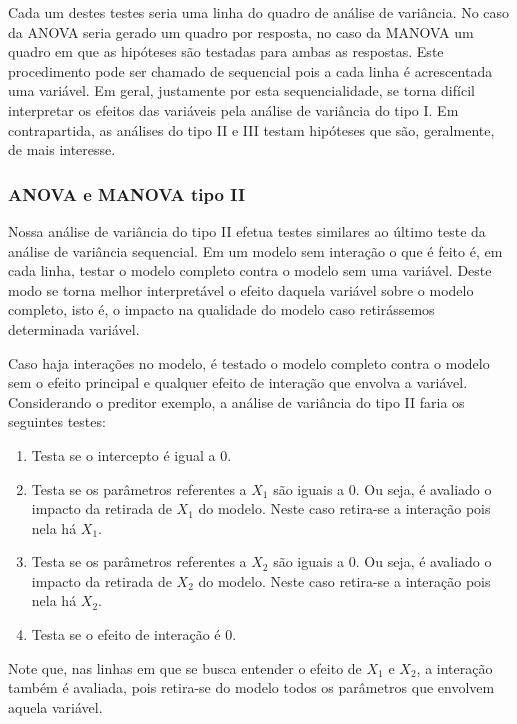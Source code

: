 \documentclass[AMA,STIX1COL]{WileyNJD-v2}
\begin{document}
Cada um destes testes seria uma linha do quadro de análise de variância. No caso da ANOVA seria gerado um quadro por resposta, no caso da MANOVA um quadro em que as hipóteses são testadas para ambas as respostas. Este procedimento pode ser chamado de sequencial pois a cada linha é acrescentada uma variável. Em geral, justamente por esta sequencialidade, se torna difícil interpretar os efeitos das variáveis pela análise de variância do tipo I. Em contrapartida, as análises do tipo II e III testam hipóteses que são, geralmente, de mais interesse.

\subsubsection{ANOVA e MANOVA tipo II}

Nossa análise de variância do tipo II efetua testes similares ao último teste da análise de variância sequencial. Em um modelo sem interação o que é feito é, em cada linha, testar o modelo completo contra o modelo sem uma variável. Deste modo se torna melhor interpretável o efeito daquela variável sobre o modelo completo, isto é, o impacto na qualidade do modelo caso retirássemos determinada variável.

Caso haja interações no modelo, é testado o modelo completo contra o modelo sem o efeito principal e qualquer efeito de interação que envolva a variável. Considerando o preditor exemplo, a análise de variância do tipo II faria os seguintes testes:

\begin{enumerate}
  \item Testa se o intercepto é igual a 0.
  
  \item Testa se os parâmetros referentes a $X_1$ são iguais a 0. Ou seja, é avaliado o impacto da retirada de $X_1$ do modelo. Neste caso retira-se a interação pois nela há $X_1$.
  
  \item Testa se os parâmetros referentes a $X_2$ são iguais a 0. Ou seja, é avaliado o impacto da retirada de $X_2$ do modelo. Neste caso retira-se a interação pois nela há $X_2$.
  
  \item Testa se o efeito de interação é 0.

\end{enumerate}

Note que, nas linhas em que se busca entender o efeito de $X_1$ e $X_2$, a interação também é avaliada, pois retira-se do modelo todos os parâmetros que envolvem aquela variável.
\end{document}
